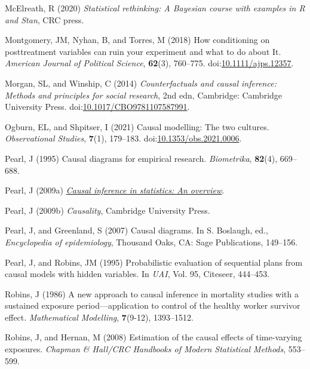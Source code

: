 \documentclass[
  singlecolumn]{article}
\newlength{\cslhangindent}
\newenvironment{CSLReferences}[2] %
 {\begin{list}{}{%
  \setlength{\itemindent}{0pt}
  \setlength{\leftmargin}{0pt}
  \setlength{\parsep}{0pt}
  \ifodd #1
   \setlength{\leftmargin}{\cslhangindent}
   \setlength{\itemindent}{-1\cslhangindent}
  \fi
  \setlength{\itemsep}{#2\baselineskip}}}
 {\end{list}}
\begin{document}
\begin{CSLReferences}{1}{0}
McElreath, R (2020) \emph{Statistical rethinking: A {B}ayesian course
with examples in {R} and {S}tan}, CRC press.

Montgomery, JM, Nyhan, B, and Torres, M (2018) How conditioning on
posttreatment variables can ruin your experiment and what to do about
It. \emph{American Journal of Political Science}, \textbf{62}(3),
760--775.
doi:\href{https://doi.org/10.1111/ajps.12357}{10.1111/ajps.12357}.

Morgan, SL, and Winship, C (2014) \emph{Counterfactuals and causal
inference: Methods and principles for social research}, 2nd edn,
Cambridge: Cambridge University Press.
doi:\href{https://doi.org/10.1017/CBO9781107587991}{10.1017/CBO9781107587991}.

Ogburn, EL, and Shpitser, I (2021) Causal modelling: The two cultures.
\emph{Observational Studies}, \textbf{7}(1), 179--183.
doi:\href{https://doi.org/10.1353/obs.2021.0006}{10.1353/obs.2021.0006}.

Pearl, J (1995) Causal diagrams for empirical research.
\emph{Biometrika}, \textbf{82}(4), 669--688.

Pearl, J (2009a) \emph{\href{https://doi.org/10.1214/09-SS057}{Causal
inference in statistics: An overview}}.

Pearl, J (2009b) \emph{Causality}, Cambridge University Press.

Pearl, J, and Greenland, S (2007) Causal diagrams. In S. Boslaugh, ed.,
\emph{Encyclopedia of epidemiology}, Thousand Oaks, CA: Sage
Publications, 149--156.

Pearl, J, and Robins, JM (1995) Probabilistic evaluation of sequential
plans from causal models with hidden variables. In \emph{UAI}, Vol. 95,
Citeseer, 444--453.

Robins, J (1986) A new approach to causal inference in mortality studies
with a sustained exposure period---application to control of the healthy
worker survivor effect. \emph{Mathematical Modelling}, \textbf{7}(9-12),
1393--1512.

Robins, J, and Hernan, M (2008) Estimation of the causal effects of
time-varying exposures. \emph{Chapman \& Hall/CRC Handbooks of Modern
Statistical Methods}, 553--599.


\end{CSLReferences}
\end{document}
